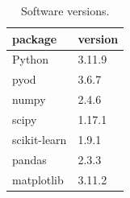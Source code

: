 \begin{table}[t]
\centering
\small
\caption{Software versions.}
\label{tab:setup-versions}
\begin{tabular}{ll}
\toprule
package & version \\
\midrule
Python & 3.11.9 \\
pyod & 3.6.7 \\
numpy & 2.4.6 \\
scipy & 1.17.1 \\
scikit-learn & 1.9.1 \\
pandas & 2.3.3 \\
matplotlib & 3.11.2 \\
\bottomrule
\end{tabular}
\end{table}
